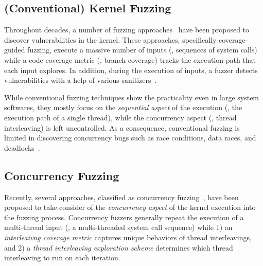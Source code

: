 
\subsection{(Conventional) Kernel Fuzzing}
\label{ss:kernelfuzzing}

Throughout decades, a number of fuzzing approaches~\cite{imf,
  syzkaller, moonshine, hfl, healer, janus, hydra, trinity} have been
proposed to discover vulnerabilities in the kernel.
%
These approaches, specifically coverage-guided fuzzing, execute a
massive number of inputs (\ie, sequences of system calls) while a code
coverage metric (\eg, branch coverage) tracks the execution path that
each input explores.
%
In addition, during the execution of inputs, a fuzzer detects
vulnerabilities with a help of various sanitizers~\cite{meds, kasan,
  asan, ubsan, lockdep}.


While conventional fuzzing techniques show the practicality even in
large system softwares, they mostly focus on the \textit{sequential
  aspect} of the execution (\ie, the execution path of a single
thread), while the concurrency aspect (\ie, thread interleaving) is
left uncontrolled.
%
As a consequence, conventional fuzzing is limited in discovering
concurrency bugs such as race conditions, data races, and
deadlocks~\cite{covcon, terragni2018effectiveness}.





\subsection{Concurrency Fuzzing}
\label{ss:concurrencyfuzzing}





Recently, several approaches, classified as concurrency
fuzzing~\cite{razzer, krace, snowboard, muzz, conzzer}, have been
proposed to take consider of the \textit{concurrency aspect} of the
kernel execution into the fuzzing process.
%
Concurrency fuzzers generally repeat the execution of a multi-thread
input (\eg, a multi-threaded system call sequence) while
%
1) an \textit{interleaivng coverage metric} captures unique behaviors
of thread interleavings, and
%
2) a \textit{thread interleaving exploration scheme} determines
which thread interleaving to run on each iteration.


